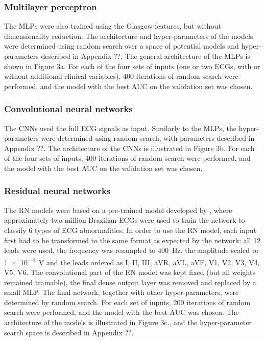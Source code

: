 \documentclass[preprint]{elsarticle}
\begin{document}
\subsubsection{Multilayer perceptron}
The MLPs were also trained using the Glasgow-features, but without dimensionality reduction. The architecture and hyper-parameters of the models were determined using random search over a space of potential models and hyper-parameters described in Appendix ??. The general architecture of the MLPs is shown in Figure 3a. For each of the four sets of inputs (one or two ECGs, with or without additional clinical variables), 400 iterations of random search were performed, and the model with the best AUC on the validation set was chosen. 

\subsubsection{Convolutional neural networks}
The CNNs used the full ECG signals as input. Similarly to the MLPs, the hyper-parameters were determined using random search, with parameters described in Appendix ??. The architecture of the CNNs is illustrated in Figure 3b. For each of the four sets of inputs, 400 iterations of random search were performed, and the model with the best AUC on the validation set was chosen. 

\subsubsection{Residual neural networks}
The RN models were based on a pre-trained model developed by \citet{ribeiro2020}, where approximately two million Brazilian ECGs were used to train the network to classify 6 types of ECG abnormalities. In order to use the RN model, each input first had to be transformed to the same format as expected by the network: all 12 leads were used, the frequency was resampled to \qty{400}{\hertz}, the amplitude scaled to \qty[print-unity-mantissa=false]{1e-4}{\volt} and the leads ordered as I, II, III, aVR, aVL, aVF, V1, V2, V3, V4, V5, V6. The convolutional part of the RN model was kept fixed (but all weights remained trainable), the final dense output layer was removed and replaced by a small MLP. The final network, together with other hyper-parameters, were determined by random search. For each set of inputs, 200 iterations of random search were performed, and the model with the best AUC was chosen. The architecture of the models is illustrated in Figure 3c., and the hyper-parameter search space is described in Appendix ??.
\end{document}
